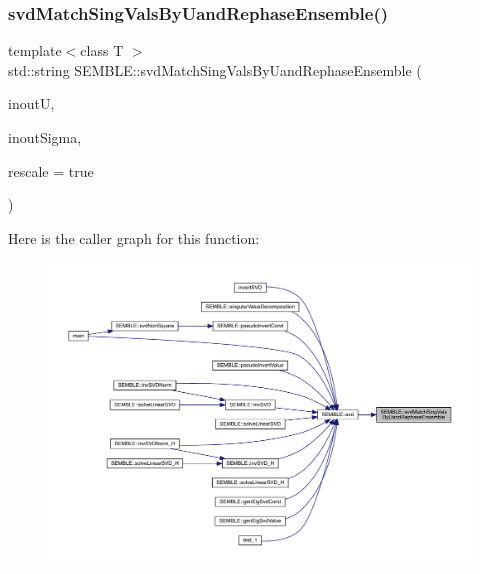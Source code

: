 \mbox{\label{namespaceSEMBLE_ac29075e3c9639bf5e3983ad36efd4c42}} 
\subsubsection{\texorpdfstring{svdMatchSingValsByUandRephaseEnsemble()}{svdMatchSingValsByUandRephaseEnsemble()}\hspace{0.1cm}{\footnotesize\ttfamily [1/2]}}
{\footnotesize\ttfamily template$<$class T $>$ \\
std\+::string S\+E\+M\+B\+L\+E\+::svd\+Match\+Sing\+Vals\+By\+Uand\+Rephase\+Ensemble (\begin{DoxyParamCaption}\item[{\mbox{\hyperlink{structSEMBLE_1_1SembleMatrix}{Semble\+Matrix}}$<$ T $>$ \&}]{inoutU,  }\item[{\mbox{\hyperlink{structSEMBLE_1_1SembleVector}{Semble\+Vector}}$<$ double $>$ \&}]{inout\+Sigma,  }\item[{const bool}]{rescale = {\ttfamily true} }\end{DoxyParamCaption})}

Here is the caller graph for this function\+:
\nopagebreak
\begin{figure}[H]
\begin{center}
\leavevmode
\includegraphics[width=350pt]{d7/dfd/namespaceSEMBLE_ac29075e3c9639bf5e3983ad36efd4c42_icgraph}
\end{center}
\end{figure}
\mbox{\label{namespaceSEMBLE_a61ca40cf973c57e2fb720ed03c22fcd6}} 
